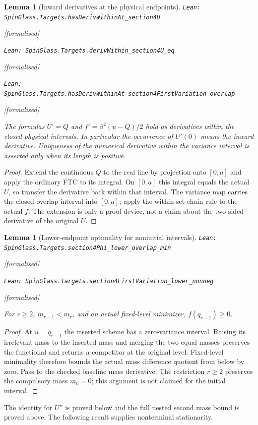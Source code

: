 \documentclass[11pt]{article}
\providecommand{\lean}[1]{\leavevmode\par\nopagebreak
  {\noindent\normalfont\footnotesize\raggedright\texttt{Lean: #1}\par}\nopagebreak}
\providecommand{\leanok}{\par\nopagebreak
  {\noindent\normalfont\footnotesize\textcolor{green!50!black}{[formalised]}\par}\nopagebreak}
\newtheorem{lemma}[theorem]{Lemma}
\begin{document}
\begin{lemma}[Inward derivatives at the physical endpoints]
\lean{SpinGlass.Targets.hasDerivWithinAt\_section4U}\leanok
\lean{SpinGlass.Targets.derivWithin\_section4U\_eq}\leanok
\lean{SpinGlass.Targets.hasDerivWithinAt\_section4FirstVariation\_overlap}\leanok
The formulas $U'=Q$ and $f'=\beta^2(u-Q)/2$ hold as derivatives within the
closed physical intervals. In particular the occurrence of $U'(0)$ means
the inward derivative. Uniqueness of the numerical derivative within the
variance interval is asserted only when its length is positive.
\end{lemma}
\begin{proof}
Extend the continuous $Q$ to the real line by projection onto $[0,a]$ and
apply the ordinary FTC to its integral. On $[0,a]$ this integral equals the
actual $U$, so transfer the derivative back within that interval. The
variance map carries the closed overlap interval into $[0,a]$; apply the
within-set chain rule to the actual $f$. The extension is only a proof
device, not a claim about the two-sided derivative of the original $U$.
\end{proof}

\begin{lemma}[Lower-endpoint optimality for noninitial intervals]
\lean{SpinGlass.Targets.section4Phi\_lower\_overlap\_min}\leanok
\lean{SpinGlass.Targets.section4FirstVariation\_lower\_nonneg}\leanok
For $r\ge2$, $m_{r-1}<m_r$, and an actual fixed-level minimizer,
$f(q_{r-1})\ge0$.
\end{lemma}
\begin{proof}
At $u=q_{r-1}$ the inserted scheme has a zero-variance interval. Raising
its irrelevant mass to the inserted mass and merging the two equal masses
preserves the functional and returns a competitor at the original level.
Fixed-level minimality therefore bounds the actual mass difference quotient
from below by zero. Pass to the checked baseline mass derivative.
The restriction $r\ge2$ preserves the compulsory mass $m_0=0$; this argument
is not claimed for the initial interval.
\end{proof}
The identity for $U''$ is proved below and the full nested second mass bound
is proved above. The following result supplies nonterminal stationarity.
\end{document}
